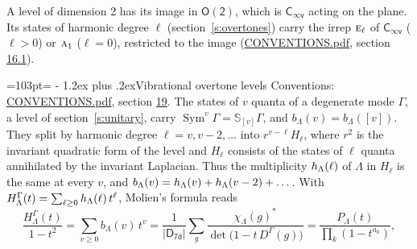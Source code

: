 \documentclass[10pt,a4paper]{article}
\makeatletter
\renewcommand\section{\@startsection{section}{1}{\z@}{-3ex plus -1ex minus -.2ex}%
  {1.2ex plus .2ex}{\normalfont\large\sffamily\bfseries\color{parttitle}}}
\newcommand{\needspace}[1]{\par\penalty-100\begingroup\dimen0=#1\relax\dimen2=\pagegoal
  \advance\dimen2-\pagetotal\ifdim\dimen0>\dimen2\relax\ifdim\dimen2>0pt\vfil\break\fi\fi
  \endgroup}
\numberwithin{equation}{section}
\newcommand{\grp}[1]{\mathsf{#1}}
\newcommand{\irr}[1]{\text{\normalfont\scshape #1}}
\newcommand{\repD}[1]{D^{#1}}
\newcommand{\irchar}[1]{\chi_{#1}}
\newcommand{\conj}[1]{{#1}^{*}}
\newcommand{\schur}[1]{\mathbb{S}_{#1}}
\newcommand{\shape}[1]{[#1]}
\makeatother
\begin{document}
A level of dimension 2 has its image in $\grp{O(2)}$, which is \href{Cinfv.pdf}{$\grp{C_{\infty v}}$} acting on the plane. \label{n:index.harmonic.degree}Its states of harmonic degree $\ell$ (section~\ref{s:overtones}) carry the irrep $\irr{e}_{\ell}$ of \href{Cinfv.pdf}{$\grp{C_{\infty v}}$} ($\ell > 0$) or $\irr{a}_{1}$ ($\ell = 0$), restricted to the image (\href{../../CONVENTIONS.pdf}{CONVENTIONS.pdf}, section \href{../../CONVENTIONS.pdf\#conv.16.1}{16.1}).
\needspace{103pt}
\section{Vibrational overtone levels}\label{s:overtones}
Conventions: \href{../../CONVENTIONS.pdf}{CONVENTIONS.pdf}, section \href{../../CONVENTIONS.pdf\#conv.19}{19}.
\leavevmode\label{n:index.quanta}\label{n:operator.symmetric.power}The states of $v$ quanta of a degenerate mode $\Gamma$, a level of section~\ref{s:unitary}, carry $\operatorname{Sym}^{v}\Gamma = \schur{\shape{v}}\Gamma$, and $b_\Lambda(v) = b_\Lambda(\shape{v})$. \label{n:local.quadratic.form}\label{n:set.harmonic}They split by harmonic degree $\ell = v, v - 2, \dots$ into $r^{v-\ell}H_\ell$, where $r^2$ is the invariant quadratic form of the level and $H_\ell$ consists of the states of $\ell$ quanta annihilated by the invariant Laplacian. \label{n:function.multiplicity.harmonic}Thus the multiplicity $\mathnormal{h}_\Lambda(\ell)$ of $\Lambda$ in $H_\ell$ is the same at every $v$, and $b_\Lambda(v) = \mathnormal{h}_\Lambda(v) + \mathnormal{h}_\Lambda(v - 2) + \dots$. \label{n:function.generating.level}With $H^{\Gamma}_\Lambda(t) = \sum_{\ell\ge0} \mathnormal{h}_\Lambda(\ell)\,t^{\ell}$, Molien's formula reads
\begin{equation}\label{e:molien}\frac{H^{\Gamma}_\Lambda(t)}{1 - t^2} = \sum_{v\ge0} b_\Lambda(v)\,t^v = \frac{1}{|\grp{D_{7d}}|}\sum_{g}\frac{\conj{\irchar{\Lambda}(g)}}{\det\bigl(1 - t\,\repD{\Gamma}(g)\bigr)} = \frac{P_\Lambda(t)}{\prod_k (1-t^{a_k})},\end{equation}
\end{document}

